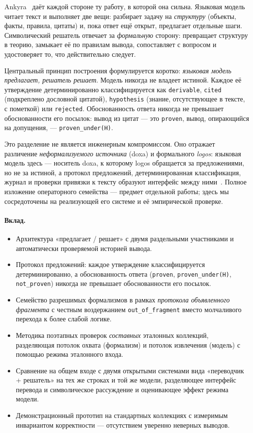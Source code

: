 \documentclass[11pt,a4paper]{article}
\begin{document}
Ankyra~\cite{ankyra} даёт каждой стороне ту работу, в которой она сильна. Языковая модель читает текст и выполняет две вещи: разбирает задачу на \emph{структуру}
(объекты, факты, правила, цитаты) и, пока ответ ещё открыт, предлагает отдельные шаги. Символический решатель отвечает за \emph{формальную} сторону:
превращает структуру в теорию, замыкает её по правилам вывода, сопоставляет с вопросом и удостоверяет то, что действительно следует.

Центральный принцип построения формулируется коротко: \emph{языковая модель предлагает, решатель решает}. Модель никогда не владеет истиной. Каждое её
утверждение детерминированно классифицируется как \texttt{derivable}, \texttt{cited} (подкреплено дословной цитатой), \texttt{hypothesis}
(знание, отсутствующее в тексте, с пометкой) или \texttt{rejected}. Обоснованность ответа никогда не превышает обоснованности его посылок:
вывод из цитат — это \texttt{proven}, вывод, опирающийся на допущения, — \texttt{proven\_under(H)}.

Это разделение не является инженерным компромиссом. Оно отражает различение \emph{неформализуемого источника} (doxa) и формального \emph{logos}:
языковая модель здесь — носитель doxa, к которому logos обращается за предложениями, но не за истиной, а протокол предложений, детерминированная
классификация, журнал и проверки привязки к тексту образуют интерфейс между ними~\cite{doxa}. Полное изложение операторного семейства — предмет
отдельной работы; здесь мы сосредоточены на реализующей его системе и её эмпирической проверке.

\paragraph{Вклад.}
\begin{itemize}
	\item Архитектура «предлагает / решает» с двумя раздельными участниками и автоматически проверяемой историей вывода.
	\item Протокол предложений: каждое утверждение классифицируется детерминированно, а обоснованность ответа (\texttt{proven}, \texttt{proven\_under(H)}, \texttt{not\_proven}) никогда не превышает обоснованности его посылок.
	\item Семейство разрешимых формализмов в рамках \emph{протокола объявленного фрагмента} с честным воздержанием \texttt{out\_of\_fragment} вместо молчаливого перехода к более слабой логике.
	\item Методика поэтапных проверок \emph{составных} эталонных коллекций, разделяющая потолок охвата (формализм) и потолок извлечения (модель) с помощью режима эталонного входа.
	\item Сравнение на общем входе с двумя открытыми системами вида «переводчик + решатель» на тех же строках и той же модели, разделяющее интерфейс перевода и символическое рассуждение и оценивающее эффект режима модели.
	\item Демонстрационный прототип на стандартных коллекциях с измеримым инвариантом корректности — отсутствием уверенно неверных выводов.
\end{itemize}
\end{document}
